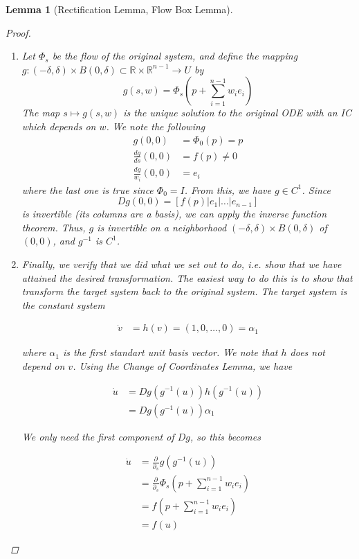 \documentclass{article}
\newtheorem{lemma}[theorem]{Lemma}
\def\R{{\mathbb R}}
\begin{document}
\begin{lemma}[Rectification Lemma, Flow Box Lemma]
\begin{proof}
\begin{enumerate}
\item Let $\Phi_s$ be the flow of the original system, and define the mapping $g: (-\delta, \delta) \times B(0, \delta) \subset \R \times \R^{n-1} \rightarrow U$ by
\[
g(s, w) = \Phi_s\left( p + \sum_{i=1}^{n-1} w_i e_i \right)
\]
The map $s \mapsto g(s, w)$ is the unique solution to the original ODE with an IC which depends on $w$. We note the following
\begin{align*}
g(0, 0) &= \Phi_0(p) = p \\
\frac{dg}{ds}(0, 0) &= f(p) \neq 0 \\
\frac{dg}{w_i}(0, 0) &= e_i
\end{align*}
where the last one is true since $\Phi_0 = I$. From this, we have $g \in C^1$. Since
\[
Dg(0, 0) = [ f(p) | e_1 | \dots | e_{n-1}]
\]
is invertible (its columns are a basis), we can apply the inverse function theorem. Thus, $g$ is invertible on a neighborhood $(-\delta, \delta) \times B(0, \delta)$ of $(0, 0)$, and $g^{-1}$ is $C^1$.
\item Finally, we verify that we did what we set out to do, i.e. show that we have attained the desired transformation. The easiest way to do this is to show that transform the target system back to the original system. The target system is the constant system 

\begin{align*}
\dot{v} &= h(v) = (1, 0, \dots, 0) = \alpha_1
\end{align*}

where $\alpha_1$ is the first standart unit basis vector. We note that $h$ does not depend on $v$. Using the Change of Coordinates Lemma, we have

\begin{align*}
\dot{u} &= Dg(g^{-1}(u))h (g^{-1}(u)) \\
&= Dg(g^{-1}(u)) \alpha_1
\end{align*}

We only need the first component of $Dg$, so this becomes

\begin{align*}
\dot{u}
&= \frac{\partial}{\partial_s} g (g^{-1}(u)) \\
&= \frac{\partial}{\partial_s} \Phi_s\left( p + \sum_{i=1}^{n-1} w_i e_i \right) \\
&= f\left( p + \sum_{i=1}^{n-1} w_i e_i \right) \\
&= f(u)
\end{align*}

\end{enumerate}
\end{proof}
\end{lemma}
\end{document}
